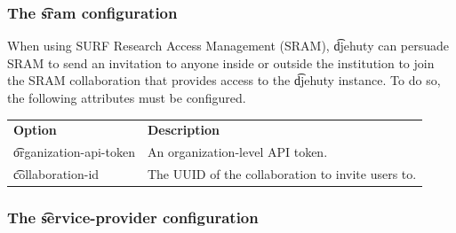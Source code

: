 \subsubsection{The \t{sram} configuration}

  When using SURF Research Access Management (SRAM),
  \t{djehuty} can persuade SRAM to send an invitation to anyone
  inside or outside the institution to join the SRAM collaboration
  that provides access to the \t{djehuty} instance.  To do so,
  the following attributes must be configured.

\begin{tabularx}{\textwidth}{*{1}{!{\VRule[-1pt]}l}!{\VRule[-1pt]}X}
  \headrow
  \textbf{Option}             & \textbf{Description}\\
  \t{organization-api-token}  & An organization-level API token.\\
  \t{collaboration-id}        & The UUID of the collaboration to invite
                                users to.
\end{tabularx}

\subsubsection{The \t{service-provider} configuration}

